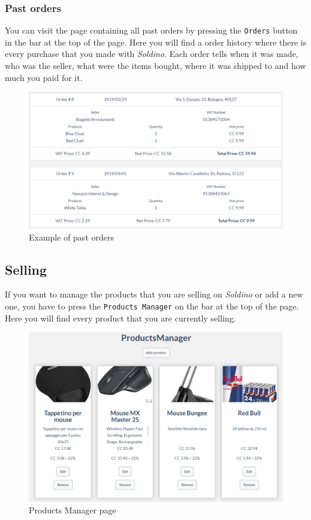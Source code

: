 		\subsubsection{Past orders}
		You can visit the page containing all past orders by pressing the 
		\texttt{Orders} button in the bar at the top of the page.
		Here you will find a order history where there is every purchase that you made 
		with \textit{Soldino}. Each order tells when it was made, who was the 
		seller, what were the items bought, where it was shipped to and how 
		much you paid for it.
		\begin{figure}[H]
			\includegraphics[width=15cm]{res/images/past_orders.png}
			\centering
			\caption{Example of past orders}
		\end{figure}
	\subsection{Selling}
	If you want to manage the products that you are selling on \textit{Soldino} 
	or add a new one, you have to press the \texttt{Products Manager} on the bar at the 
	top of the page. Here you will find every product that you are currently selling.
	\begin{figure}[H]
		\includegraphics[width=15cm]{res/images/products_manager.png}
		\centering
		\caption{Products Manager page}
	\end{figure}
